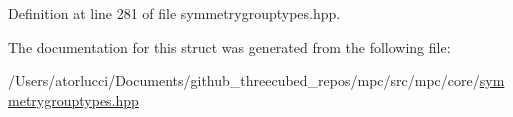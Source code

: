 Definition at line 281 of file symmetrygrouptypes.\+hpp.



The documentation for this struct was generated from the following file\+:\begin{DoxyCompactItemize}
\item 
/\+Users/atorlucci/\+Documents/github\+\_\+threecubed\+\_\+repos/mpc/src/mpc/core/\mbox{\hyperlink{symmetrygrouptypes_8hpp}{symmetrygrouptypes.\+hpp}}\end{DoxyCompactItemize}
